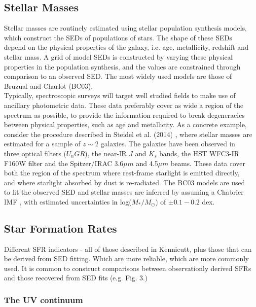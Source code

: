 \documentclass{literature}
\begin{document}
\subsection{Stellar Masses}
Stellar masses are routinely estimated using stellar population synthesis models, which construct the SEDs of populations of stars. The shape of these SEDs depend on the physical properties of the galaxy, i.e. age, metallicity, redshift and stellar mass. A grid of model SEDs is constructed by varying these physical properties in the population synthesis, and the values are constrained through comparison to an observed SED. The most widely used models are those of Bruzual and Charlot \citep{Bruzual2003} (BC03). \\      
Typically, spectroscopic surveys will target well studied fields to make use of ancillary photometric data. These data preferably cover as wide a region of the spectrum as possible, to provide the information required to break degeneracies between physical properties, such as age and metallicity. As a concrete example, consider the procedure described in Steidel et al. (2014) \citep{Steidel2014}, where stellar masses are estimated for a sample of $z \sim 2$ galaxies. The galaxies have been observed in three optical filters (\textit{$U_{n}GR$}), the near-IR  $ J $ and $ K_{s}$ bands, the HST WFC3-IR F160W filter and the Spitzer/IRAC 3.6$\mu m$ and 4.5$\mu m$ beams. These data cover both the region of the spectrum where rest-frame starlight is emitted directly, and where starlight absorbed by dust is re-radiated. The BC03 models are used to fit the observed SED and stellar masses are inferred by assuming a Chabrier IMF \citep{Chabrier2003}, with estimated uncertainties in log($M_{*} /M_{\odot}$) of $\pm 0.1-0.2 $ dex.    


\subsection{Star Formation Rates}

Different SFR indicators - all of those described in Kennicutt, plus those that can be derived from SED fitting. Which are more reliable, which are more commonly used. It is common to construct comparisons between observationly derived SFRs and those recovered from SED fits (e.g. \citep{Steidel2014} Fig. 3.) \\
\subsubsection{The UV continuum}
\end{document}
